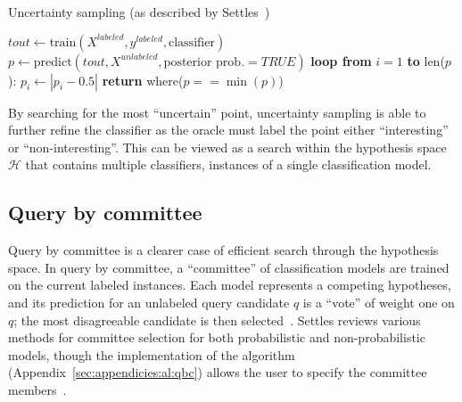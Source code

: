 \tablespacing
\begin{algorithm}[H]
	\caption{Uncertainty sampling (as described by 
	Settles~\cite{settles2010})}\label{alg:al:methods:uncertainty}
	\begin{algorithmic}[1]
		\State $\textit{tout} \gets 
		\text{train}(X^{labeled},y^{labeled},\text{classifier})$
		\State $p \gets 
		\text{predict}(\textit{tout},X^{unlabeled},
		\text{posterior prob.} = TRUE)$
		\State \textbf{loop from} $i=1$ \textbf{to} len($p$):
		\State \indent $p_i \gets |p_i-0.5|$
		\State \textbf{return} where($p==\min{(p)}$)
		\EndProcedure
	\end{algorithmic}
\end{algorithm}
\bodyspacing

\noindent By searching for the most ``uncertain'' point, uncertainty sampling 
is able to further refine the classifier as the oracle must label the point 
either ``interesting'' or ``non-interesting''. This can be viewed as a search 
within the hypothesis space $\mathcal{H}$ that contains multiple classifiers, 
instances of a single classification model.








\subsection{Query by committee}
\label{sec:al:methods:qbc}

Query by committee is a clearer case of efficient search through the hypothesis 
space. In query by committee, a ``committee'' of classification models are 
trained on the  current labeled instances.  Each model represents a competing 
hypotheses, and its prediction for an unlabeled query candidate $q$ is a 
``vote'' of weight one on $q$; the most disagreeable candidate is then 
selected~\cite{settles2010}. Settles reviews various methods for committee 
selection for both probabilistic and non-probabilistic models, though the 
implementation of the algorithm (Appendix~\ref{sec:appendicies:al:qbc}) allows 
the user to specify the committee members~\cite{settles2010}. 

